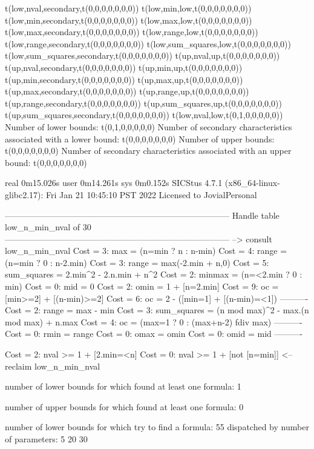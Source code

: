 t(low,nval,secondary,t(0,0,0,0,0,0,0))
t(low,min,low,t(0,0,0,0,0,0,0))
t(low,min,secondary,t(0,0,0,0,0,0,0))
t(low,max,low,t(0,0,0,0,0,0,0))
t(low,max,secondary,t(0,0,0,0,0,0,0))
t(low,range,low,t(0,0,0,0,0,0,0))
t(low,range,secondary,t(0,0,0,0,0,0,0))
t(low,sum_squares,low,t(0,0,0,0,0,0,0))
t(low,sum_squares,secondary,t(0,0,0,0,0,0,0))
t(up,nval,up,t(0,0,0,0,0,0,0))
t(up,nval,secondary,t(0,0,0,0,0,0,0))
t(up,min,up,t(0,0,0,0,0,0,0))
t(up,min,secondary,t(0,0,0,0,0,0,0))
t(up,max,up,t(0,0,0,0,0,0,0))
t(up,max,secondary,t(0,0,0,0,0,0,0))
t(up,range,up,t(0,0,0,0,0,0,0))
t(up,range,secondary,t(0,0,0,0,0,0,0))
t(up,sum_squares,up,t(0,0,0,0,0,0,0))
t(up,sum_squares,secondary,t(0,0,0,0,0,0,0))
t(low,nval,low,t(0,1,0,0,0,0,0))
Number of lower bounds:                                             t(0,1,0,0,0,0,0)
Number of secondary characteristics associated with a lower bound:  t(0,0,0,0,0,0,0)
Number of upper bounds:                                             t(0,0,0,0,0,0,0)
Number of secondary characteristics associated with an upper bound: t(0,0,0,0,0,0,0)

real	0m15.026s
user	0m14.261s
sys	0m0.152s
SICStus 4.7.1 (x86_64-linux-glibc2.17): Fri Jan 21 10:45:10 PST 2022
Licensed to JovialPersonal


--------------------------------------------------------------------------------
Handle table low_n_min_nval of 30
--------------------------------------------------------------------------------
--> consult low_n_min_nval
Cost =  3:  max         = (n=min ? n : n-min)
Cost =  4:  range       = (n=min ? 0 : n-2.min)
Cost =  3:  range       = max(-2.min + n,0)
Cost =  5:  sum_squares = 2.min^2 - 2.n.min + n^2
Cost =  2:  minmax      = (n=<2.min ? 0 : min)
Cost =  0:  mid         = 0
Cost =  2:  omin        = 1 + [n=2.min]
Cost =  9:  oc          = [min>=2] + [(n-min)>=2]
Cost =  6:  oc          = 2 - ([min=1] + [(n-min)=<1])
----------
Cost =  2:  range       = max - min
Cost =  3:  sum_squares = (n mod max)^2 - max.(n mod max) + n.max
Cost =  4:  oc          = (max=1 ? 0 : (max+n-2) fdiv max)
----------
Cost =  0:  rmin        = range
Cost =  0:  omax        = omin
Cost =  0:  omid        = mid
----------

Cost =  2:  nval >= 1 + [2.min=<n]
Cost =  0:  nval >= 1 + [not [n=min]]
<-- reclaim low_n_min_nval

number of lower bounds for which found at least one formula: 1

number of upper bounds for which found at least one formula: 0

number of lower bounds for which try to find a formula: 55
dispatched by number of parameters: 5  20  30

